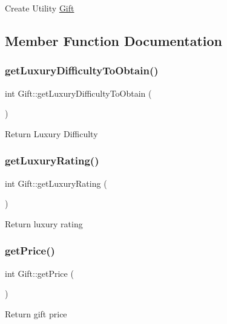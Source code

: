 Create Utility \hyperlink{class_gift}{Gift} 

\subsection{Member Function Documentation}
\mbox{\label{class_gift_aa7315f0e639d60a32c53eaaacddba937}} 
\subsubsection{\texorpdfstring{get\+Luxury\+Difficulty\+To\+Obtain()}{getLuxuryDifficultyToObtain()}}
{\footnotesize\ttfamily int Gift\+::get\+Luxury\+Difficulty\+To\+Obtain (\begin{DoxyParamCaption}{ }\end{DoxyParamCaption})}

Return Luxury Difficulty \mbox{\label{class_gift_a13f625f3bf17ea98bdc61c0f824b77a4}} 
\subsubsection{\texorpdfstring{get\+Luxury\+Rating()}{getLuxuryRating()}}
{\footnotesize\ttfamily int Gift\+::get\+Luxury\+Rating (\begin{DoxyParamCaption}{ }\end{DoxyParamCaption})}

Return luxury rating \mbox{\label{class_gift_aa114ca9629b5f02e4df6731d33c69373}} 
\subsubsection{\texorpdfstring{get\+Price()}{getPrice()}}
{\footnotesize\ttfamily int Gift\+::get\+Price (\begin{DoxyParamCaption}{ }\end{DoxyParamCaption})}

Return gift price \mbox{\label{class_gift_a999437028eda2a5aac1f3ad1c3f22cf9}} 

